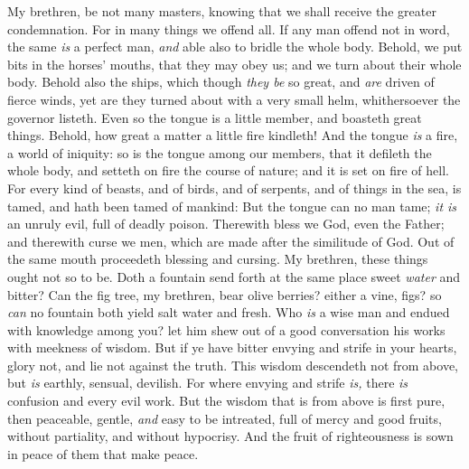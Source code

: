 \documentclass[11pt,letterpaper,oneside]{memoir}
\begin{document}
My brethren, be not many masters, knowing that we shall receive the 
greater condemnation. For in many things we offend all. If any man 
offend not in word, the same \emph{is} a perfect man, \emph{and} able also to 
bridle the whole body. Behold, we put bits in the horses' mouths, that 
they may obey us; and we turn about their whole body. Behold also the 
ships, which though \emph{they be} so great, and \emph{are} driven of fierce 
winds, yet are they turned about with a very small helm, whithersoever 
the governor listeth. Even so the tongue is a little member, and 
boasteth great things. Behold, how great a matter a little fire 
kindleth! And the tongue \emph{is} a fire, a world of iniquity: so is the 
tongue among our members, that it defileth the whole body, and setteth 
on fire the course of nature; and it is set on fire of hell. For every 
kind of beasts, and of birds, and of serpents, and of things in the sea, 
is tamed, and hath been tamed of mankind: But the tongue can no man 
tame; \emph{it is} an unruly evil, full of deadly poison. Therewith bless we 
God, even the Father; and therewith curse we men, which are made after 
the similitude of God. Out of the same mouth proceedeth blessing and 
cursing. My brethren, these things ought not so to be. Doth a fountain 
send forth at the same place sweet \emph{water} and bitter? Can the fig tree, 
my brethren, bear olive berries? either a vine, figs? so \emph{can} no 
fountain both yield salt water and fresh. Who \emph{is} a wise man and endued 
with knowledge among you? let him shew out of a good conversation his 
works with meekness of wisdom. But if ye have bitter envying and strife 
in your hearts, glory not, and lie not against the truth. This wisdom 
descendeth not from above, but \emph{is} earthly, sensual, devilish. For 
where envying and strife \emph{is,} there \emph{is} confusion and every evil work. 
But the wisdom that is from above is first pure, then peaceable, gentle, 
\emph{and} easy to be intreated, full of mercy and good fruits, without 
partiality, and without hypocrisy. And the fruit of righteousness is 
sown in peace of them that make peace. 
\end{document}
